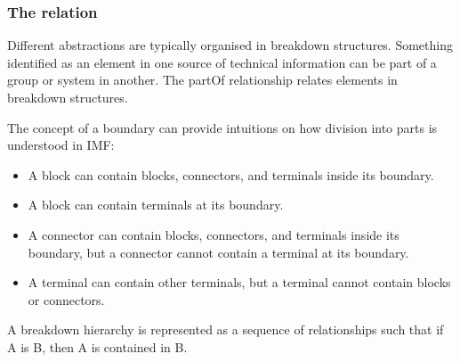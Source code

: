 \documentclass[../main.tex]{subfiles}
\begin{document}


\subsubsection{The  relation}
Different abstractions are typically organised in breakdown structures. Something identified as an element in one source of technical information can be part of a group or system in another. The partOf %
relationship relates elements in breakdown structures. 

The concept of a boundary can provide intuitions on how  %
division into parts is understood in IMF: 
\begin{itemize}
  \item A block can contain blocks, connectors, and terminals inside its boundary.
  \item A block can contain terminals at its boundary.
  \item A connector can contain blocks, connectors, and terminals inside its boundary, but a connector cannot contain a terminal at its boundary.
  \item A terminal can contain other terminals, but a terminal cannot contain blocks or connectors. 
\end{itemize}
A breakdown hierarchy is represented as a sequence of  relationships such that if A is  B, then A is contained in B. 
\end{document}

